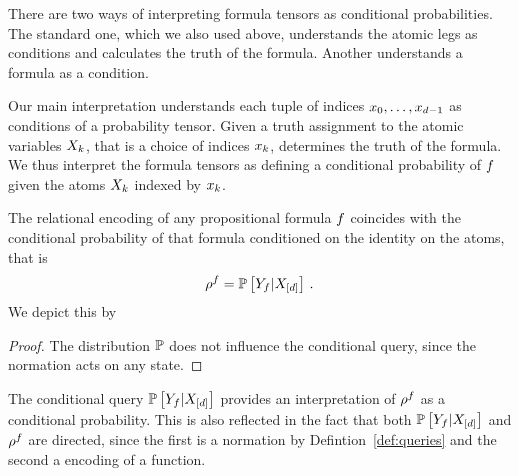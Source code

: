 


There are two ways of interpreting formula tensors as conditional probabilities.
The standard one, which we also used above, understands the atomic legs as conditions and calculates the truth of the formula.
Another understands a formula as a condition.


Our main interpretation understands each tuple of indices ${x_{0},\ldots,x_{d-1}}$ as conditions of a probability tensor.
Given a truth assignment to the atomic variables $X_{k}$, that is a choice of indices $x_{k}$, determines the truth of the formula.
We thus interpret the formula tensors as defining a conditional probability of $f$ given the atoms $X_{k}$ indexed by $x_{k}$.

\begin{theorem}\label{the:conditionByAtoms}
	The relational encoding of any propositional formula $f$ coincides with the conditional probability of that formula conditioned on the identity on the atoms, that is
		\[ \rho^{f} = \mathbb{P}\left[Y_{f}|X_{[d]}\right] \, . \]
	We depict this by
	\begin{center}
		
	\end{center}
\end{theorem}
\begin{proof}
	The distribution $\mathbb{P}$ does not influence the conditional query, since the normation acts on any state.
\end{proof}


The conditional query $\mathbb{P}\left[Y_{f}|X_{[d]}\right]$ provides an interpretation of $\rho^{f}$ as a conditional probability. 
This is also reflected in the fact that both $\mathbb{P}\left[Y_{f}|X_{[d]}\right]$ and $\rho^{f}$ are directed, since the first is a normation by Defintion~\ref{def:queries} and the second a encoding of a function.

